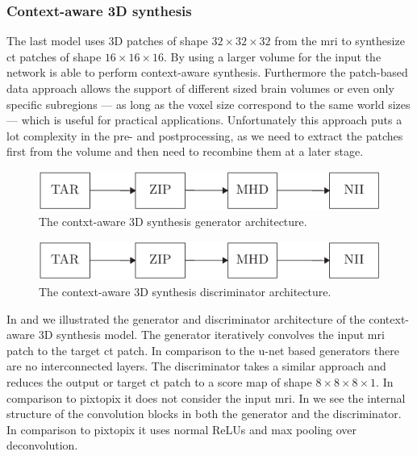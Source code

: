 \subsubsection{Context-aware 3D synthesis}

The last model uses 3D patches of shape $32\times32\times32$ from the
\gls{mri} to synthesize \gls{ct} patches of shape $16\times16\times16$. By
using a larger volume for the input the network is able to perform
context-aware synthesis. Furthermore the patch-based data approach allows the
support of different sized brain volumes or even only specific subregions ---
as long as the voxel size correspond to the same world sizes --- which is
useful for practical applications. Unfortunately this approach puts a lot
complexity in the pre- and postprocessing, as we need to extract the patches
first from the volume and then need to recombine them at a later stage.
\begin{figure}[h]
  \centering
  \includegraphics[page=5,width=.8\linewidth]{figure/diagrams.pdf}
  \caption{The contxt-aware 3D synthesis generator architecture.
  }\label{fig:synthesis:gen}
\end{figure}
\begin{figure}[h]
  \centering
  \includegraphics[page=6,width=.8\linewidth]{figure/diagrams.pdf}
  \caption{The context-aware 3D synthesis discriminator architecture.
	}\label{fig:synthesis:disc}
\end{figure}
In  and  we illustrated the
generator and discriminator architecture of the context-aware 3D synthesis
model. The generator iteratively convolves the input \gls{mri} patch to the
target \gls{ct} patch. In comparison to the u-net based generators there
are no interconnected layers. The discriminator takes a similar approach and
reduces the output or target \gls{ct} patch to a score map of shape
$8\times8\times8\times1$. In comparison to pixtopix it does not consider the
input \gls{mri}.
In  we see the internal structure of the
convolution blocks in both the generator and the discriminator. In comparison
to pixtopix it uses normal ReLUs and max pooling over deconvolution.

